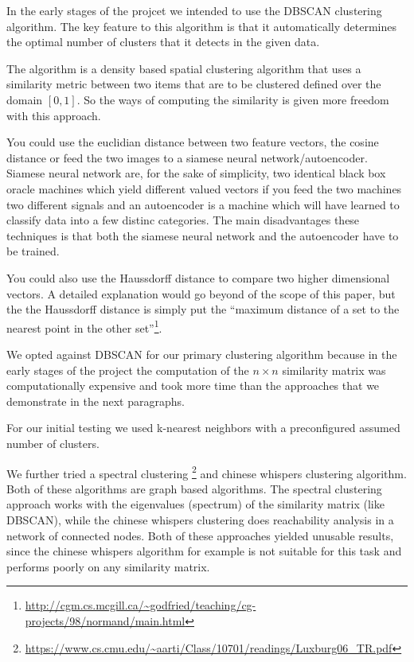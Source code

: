 \documentclass[journal]{vgtc}       %
\begin{document}
In the early stages of the projcet we intended to use the DBSCAN clustering algorithm. 
The key feature to this algorithm is that it automatically determines the optimal number of clusters that it detects in the given data. 

The algorithm is a density based spatial clustering algorithm that uses a similarity metric between two items that are to be  clustered defined over the domain \([0,1]\). So the ways of computing the similarity is given more freedom with this approach.

You could use the euclidian distance between two feature vectors, the cosine distance or feed the two images to a siamese neural network/autoencoder. Siamese neural network are, for the sake of simplicity, two identical black box oracle machines which yield different valued vectors if you feed the two machines two different signals and  an autoencoder is a machine which will have learned to classify data into a few distinc categories. The main disadvantages these techniques is that both the siamese neural network and the autoencoder have to be trained. 

You could also use the Haussdorff distance to compare two higher dimensional vectors. A detailed explanation would go beyond of the scope of this paper, but the the Haussdorff distance is simply put the ``maximum distance of a set to the nearest point in the other set''\footnote{\url{http://cgm.cs.mcgill.ca/~godfried/teaching/cg-projects/98/normand/main.html}}.

We opted against DBSCAN for our primary clustering algorithm because in the early stages of the project the computation of the \(n\times n\) similarity matrix was  computationally expensive and took more time than the approaches that we demonstrate in the next paragraphs.

For our initial testing we used k-nearest neighbors with a preconfigured assumed number of clusters.

We further tried  a  spectral clustering  \footnote{\url{https://www.cs.cmu.edu/~aarti/Class/10701/readings/Luxburg06_TR.pdf}} and chinese whispers clustering algorithm\cite{chinesewhispers}. Both of these algorithms are graph based algorithms. The spectral clustering approach works with the eigenvalues (spectrum) of the similarity matrix (like DBSCAN), while the chinese whispers clustering does reachability analysis in a network of connected nodes.
Both of these approaches yielded unusable results, since the chinese whispers algorithm for example  is not suitable for this task and performs poorly on any similarity matrix.
\end{document}
